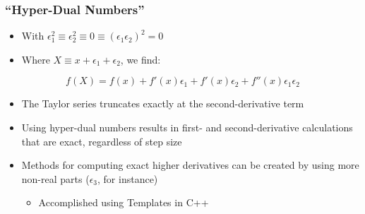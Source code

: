 \documentclass[mathserif]{beamer}
\begin{document}
\begin{frame}
\frametitle{``Hyper-Dual Numbers''}
 \begin{itemize}
  \item With $\epsilon_1^2 \equiv \epsilon_2^2 \equiv 0 \equiv (\epsilon_1
	\epsilon_2)^2 = 0$
	
  \item Where $X \equiv x + \epsilon_1 + \epsilon_2$, we find:
 \end{itemize}
 \[ f(X) = f(x) + f'(x) \epsilon_1 + f'(x) \epsilon_2 + f''(x) \epsilon_1 \epsilon_2 \]

 \begin{itemize}
  \item The Taylor series truncates exactly at the second-derivative term
  \item Using hyper-dual numbers results in first- and second-derivative
	calculations that are exact, regardless of step size
  \item Methods for computing exact higher derivatives can be created by
	using more non-real parts ($\epsilon_3$, for instance)
  \begin{itemize}
   \item Accomplished using Templates in C++
  \end{itemize}
 \end{itemize}
\end{frame}
\end{document}
